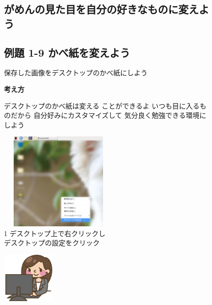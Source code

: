 \documentclass[a4paper,12pt]{jarticle}
\begin{document}
\begin{figure}
  \subsection{がめんの見た目を自分の好きなものに変えよう}
  \subsection{例題 1-9 かべ紙を変えよう}
  保存した画像をデスクトップのかべ紙にしよう

  \textbf{考え方}


  \bigskip



  \centering
  \begin{minipage}{\textwidth}
    \begin{minipage}{7.737cm}
      デスクトップのかべ紙は変える
      ことができるよ
      いつも目に入るものだから
      自分好みにカスタマイズして
      気分良く勉強できる環境にしよう
      \begin{minipage}{7.739cm}
        \includegraphics[width=5.892cm,height=4.864cm]{textbook-img107.png}\\
        1 デスクトップ上で右クリックし\\
        デスクトップの設定をクリック
      \end{minipage}
    \end{minipage}
    \begin{minipage}{2.582cm}
    \end{minipage}
    \begin{minipage}{7.737cm}
      \includegraphics[width=2.712cm,height=2.509cm]{textbook-img082.png}

\end{minipage}
\end{minipage}
\end{figure}
\end{document}
